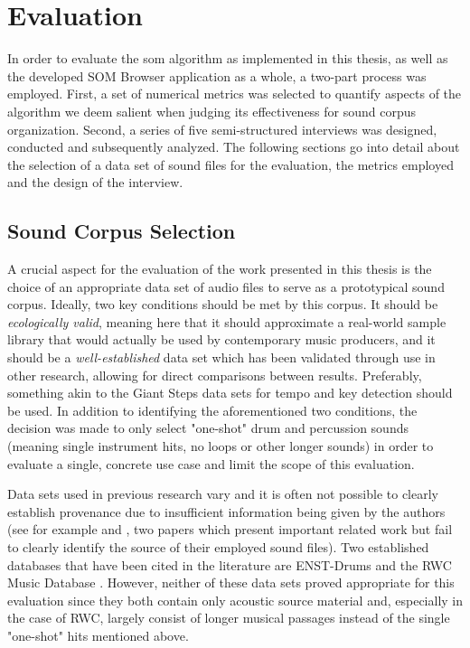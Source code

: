 
\section{Evaluation}
\label{sec:evaluation}
In order to evaluate the \gls{som} algorithm as implemented in this thesis, as
well as the developed SOM Browser application as a whole, a two-part process
was employed. First, a set of numerical metrics was selected to quantify aspects
of the algorithm we deem salient when judging its effectiveness for sound corpus
organization. Second, a series of five semi-structured interviews was designed,
conducted and subsequently analyzed. The following sections go into detail about
the selection of a data set of sound files for the evaluation, the metrics
employed and the design of the interview.

\subsection{Sound Corpus Selection}
\label{subsec:eval_corpus_selection}
A crucial aspect for the evaluation of the work presented in this thesis is the
choice of an appropriate data set of audio files to serve as a prototypical
sound corpus. Ideally, two key conditions should be met by this corpus. It
should be \textit{ecologically valid}, meaning here that it should approximate a
real-world sample library that would actually be used by contemporary music
producers, and it should be a \textit{well-established} data set which has been
validated through use in other research, allowing for direct comparisons between
results. Preferably, something akin to the Giant Steps data sets
\citep{knees2015} for tempo and key detection should be used.
In addition to identifying the aforementioned two conditions, the decision was
made to only select "one-shot" drum and percussion sounds (meaning single
instrument hits, no loops or other longer sounds) in order to evaluate a single,
concrete use case and limit the scope of this evaluation.

\smallskip

Data sets used in previous research vary and it is often not possible to clearly
establish provenance due to insufficient information being given by the authors
(see for example \citet{fried2014} and \citet{shier2017}, two papers which
present important related work but fail to clearly identify the source of their
employed sound files). Two established databases that have been cited in the
literature are ENST-Drums \citep{gillet2006} and the RWC Music Database
\citep{goto2002}. However, neither of these data sets proved appropriate for
this evaluation since they both contain only acoustic source material and,
especially in the case of RWC, largely consist of longer musical passages
instead of the single "one-shot" hits mentioned above.

